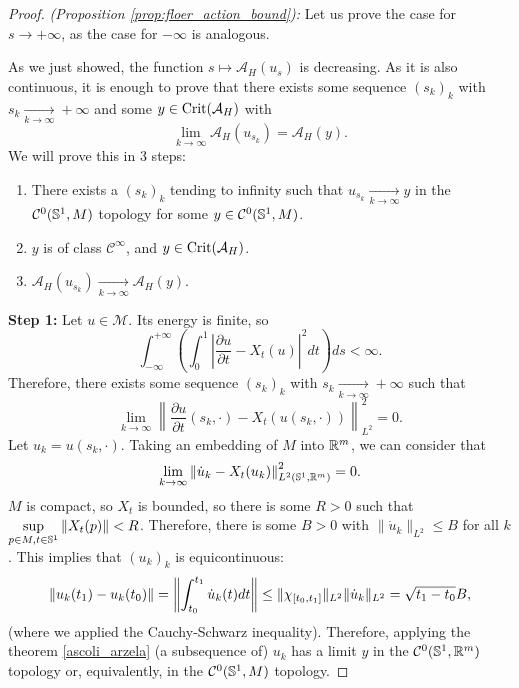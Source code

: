 \begin{proof} {\it (Proposition \ref{prop:floer_action_bound}):} Let us prove the case for $s \rightarrow +\infty$, as the case for $-\infty$ is analogous.

As we just showed, the function $s \mapsto \mathcal{A}_H(u_s)$ is decreasing. As it is also continuous, it is enough to prove that there exists some sequence $(s_k)_k$ with $s_k \xrightarrow[k \rightarrow \infty]{} +\infty$ and some $y \in \mathrm{Crit}(\mathcal{A}_H)$ with
\[\lim_{k \rightarrow \infty} \mathcal{A}_H(u_{s_k}) = \mathcal{A}_H(y) .\]
We will prove this in 3 steps:
\begin{enumerate}
	\item There exists a $(s_k)_k$ tending to infinity such that $u_{s_k} \xrightarrow[k\rightarrow \infty]{} y$ in the $\mathcal{C}^0(\mathbb{S}^1,M)$ topology for some $y \in \mathcal{C}^0(\mathbb{S}^1,M)$.
	\item $y$ is of class $\mathcal{C}^{\infty}$, and $y \in \mathrm{Crit}(\mathcal{A}_H)$.
	\item $\mathcal{A}_H(u_{s_k}) \xrightarrow[k \rightarrow \infty]{} \mathcal{A}_H(y)$.
\end{enumerate}

{\bf Step 1:} Let $u \in \mathcal{M}$. Its energy is finite, so
\[\int_{-\infty}^{+\infty} \left( \int_0^1 \left| \frac{\partial u}{\partial t} - X_t(u) \right|^2 dt \right) ds < \infty .\]
Therefore, there exists some sequence $(s_k)_k$ with $s_k \xrightarrow[k\rightarrow \infty]{} +\infty$ such that
\[\lim_{k\rightarrow \infty} \left\| \frac{\partial u}{\partial t}(s_k,\cdot) - X_t(u(s_k,\cdot)) \right\|_{L^2}^2 = 0 .\]
Let $u_k = u(s_k,\cdot)$. Taking an embedding of $M$ into $\mathbb{R}^m$, we can consider that
\[\lim_{k\rightarrow \infty} \left\| \dot{u}_k - X_t(u_k) \right\|_{L^2(\mathbb{S}^1,\mathbb{R}^m)}^2 = 0 .\]
$M$ is compact, so $X_t$ is bounded, so there is some $R > 0$ such that $\displaystyle\sup_{p \in M, t \in \mathbb{S}^1} \|X_t(p)\| < R$. Therefore, there is some $B > 0$ with $\|\dot{u}_k\|_{L^2} \leq B$ for all $k$. This implies that $(u_k)_k$ is equicontinuous:
\[\|u_k(t_1) - u_k(t_0)\| = \left\| \int_{t_0}^{t_1} \dot{u}_k(t)dt \right\| \leq \|\chi_{[t_0,t_1]}\|_{L^2} \|\dot{u}_k\|_{L^2} = \sqrt{t_1-t_0} B ,\]
(where we applied the Cauchy-Schwarz inequality). Therefore, applying the theorem \ref{ascoli_arzela} (a subsequence of) $u_k$ has a limit $y$ in the $\mathcal{C}^0(\mathbb{S}^1,\mathbb{R}^m)$ topology or, equivalently, in the $\mathcal{C}^0(\mathbb{S}^1,M)$ topology.


\end{proof}
